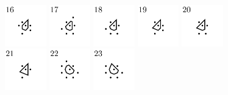 \documentclass[text.tex]{subfiles}
\begin{document}
\begin{figure}[h!]
\includegraphics[width=0.16\textwidth]{img/results/circle8_concat/circle8_100000_(1_0alpha_1)_016.pdf}
\includegraphics[width=0.16\textwidth]{img/results/circle8_concat/circle8_100000_(1_0alpha_1)_017.pdf}
\includegraphics[width=0.16\textwidth]{img/results/circle8_concat/circle8_100000_(1_0alpha_1)_018.pdf}
\includegraphics[width=0.16\textwidth]{img/results/circle8_concat/circle8_100000_(1_0alpha_1)_019.pdf}
\includegraphics[width=0.16\textwidth]{img/results/circle8_concat/circle8_100000_(1_0alpha_1)_020.pdf}
\includegraphics[width=0.16\textwidth]{img/results/circle8_concat/circle8_100000_(1_0alpha_1)_021.pdf}
\includegraphics[width=0.16\textwidth]{img/results/circle8_concat/circle8_100000_(1_0alpha_1)_022.pdf}
\includegraphics[width=0.16\textwidth]{img/results/circle8_concat/circle8_100000_(1_0alpha_1)_023.pdf}

\end{figure}
\end{document}
